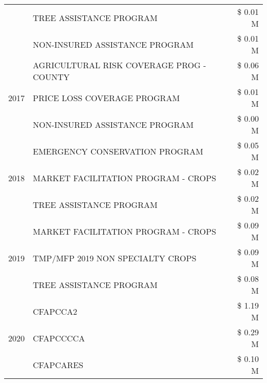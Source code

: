 \begin{tabular}{llr}
 & TREE ASSISTANCE PROGRAM & \$ 0.01 M \\
 & NON-INSURED ASSISTANCE PROGRAM & \$ 0.01 M \\
\cline{1-3}
\multirow[t]{3}{*}{2017} & AGRICULTURAL RISK COVERAGE PROG - COUNTY & \$ 0.06 M \\
 & PRICE LOSS COVERAGE PROGRAM & \$ 0.01 M \\
 & NON-INSURED ASSISTANCE PROGRAM & \$ 0.00 M \\
\cline{1-3}
\multirow[t]{3}{*}{2018} & EMERGENCY CONSERVATION PROGRAM & \$ 0.05 M \\
 & MARKET FACILITATION PROGRAM - CROPS & \$ 0.02 M \\
 & TREE ASSISTANCE PROGRAM & \$ 0.02 M \\
\cline{1-3}
\multirow[t]{3}{*}{2019} & MARKET FACILITATION PROGRAM - CROPS & \$ 0.09 M \\
 & TMP/MFP 2019 NON SPECIALTY CROPS & \$ 0.09 M \\
 & TREE ASSISTANCE PROGRAM & \$ 0.08 M \\
\cline{1-3}
\multirow[t]{3}{*}{2020} & CFAPCCA2 & \$ 1.19 M \\
 & CFAPCCCCA & \$ 0.29 M \\
 & CFAPCARES & \$ 0.10 M \\
\cline{1-3}
\bottomrule
\end{tabular}
